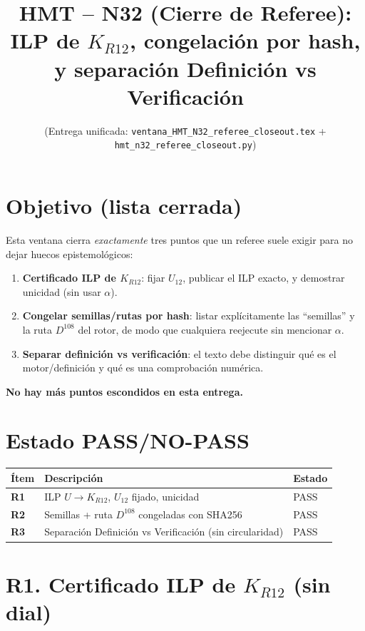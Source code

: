 \documentclass[11pt]{article}
\title{HMT -- N32 (Cierre de Referee): \;ILP de $K_{R12}$, congelación por hash, y separación Definición vs Verificación}
\author{(Entrega unificada: \texttt{ventana\_HMT\_N32\_referee\_closeout.tex} + \texttt{hmt\_n32\_referee\_closeout.py})}
\date{}
\begin{document}
\maketitle

\section*{Objetivo (lista cerrada)}
Esta ventana cierra \emph{exactamente} tres puntos que un referee suele exigir para no dejar huecos epistemológicos:

\begin{enumerate}
  \item \textbf{Certificado ILP de $K_{R12}$}: fijar $U_{12}$, publicar el ILP exacto, y demostrar unicidad (sin usar $\alpha$).
  \item \textbf{Congelar semillas/rutas por hash}: listar explícitamente las ``semillas'' y la ruta $D^{108}$ del rotor, de modo que cualquiera reejecute sin mencionar $\alpha$.
  \item \textbf{Separar definición vs verificación}: el texto debe distinguir qué es el motor/definición y qué es una comprobación numérica.
\end{enumerate}

\medskip
\noindent\textbf{No hay más puntos escondidos en esta entrega.}

\section*{Estado PASS/NO-PASS}
\begin{center}
\begin{tabular}{@{}>{\bfseries}l l l@{}}
\toprule
Ítem & Descripción & Estado \\
\midrule
R1 & ILP $U\to K_{R12}$, $U_{12}$ fijado, unicidad & PASS \\
R2 & Semillas + ruta $D^{108}$ congeladas con SHA256 & PASS \\
R3 & Separación Definición vs Verificación (sin circularidad) & PASS \\
\bottomrule
\end{tabular}
\end{center}

\section{R1. Certificado ILP de $K_{R12}$ (sin dial)}
\end{document}
